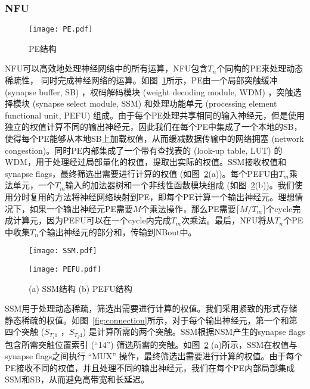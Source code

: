 \subsubsection{NFU}

\begin{figure}[h]
\centering
\texttt{[image: PE.pdf]}
\caption{PE结构}
\label{fig:PE}
\end{figure}

NFU可以高效地处理神经网络中的所有运算，NFU包含$T_n$个同构的PE来处理动态稀疏性， 同时完成神经网络的运算。如图~\ref{fig:PE}所示，PE由一个局部突触缓冲 (synapse buffer, SB) ，权码解码模块 (weight decoding module, WDM) ，突触选择模块 (synapse select module, SSM) 和处理功能单元 (processing element functional unit, PEFU) 组成。由于每个PE处理共享相同的输入神经元，但是使用独立的权值计算不同的输出神经元，因此我们在每个PE中集成了一个本地的SB，使得每个PE能够从本地SB上加载权值，从而缓减数据传输中的网络拥塞 (network congestion)。同时PE内部集成了一个带有查找表的 (look-up table, LUT) 的WDM，用于处理经过局部量化的权值，提取出实际的权值。SSM接收权值和synapse flags，最终筛选出需要进行计算的权值 (如图~\ref{fig:PEFU}(a))。每个PEFU由$T_m$乘法单元，一个$T_m$输入的加法器树和一个非线性函数模块组成 (如图~\ref{fig:PEFU}(b))。我们使用分时复用的方法将神经网络映射到PE，即每个PE计算一个输出神经元。理想情况下，如果一个输出神经元PE需要$M$个乘法操作，那么PE需要$\lceil M/T_{m} \rceil$个cycle完成计算元，因为PEFU可以在一个cycle内完成$T_m$次乘法。最后，NFU将从$T_n$个PE中收集$T_n$个输出神经元的部分和，传输到NBout中。

\begin{figure}[h]
\centering
\begin{minipage}[b]{0.54\columnwidth}
\texttt{[image: SSM.pdf]}
\end{minipage}
\hfill
\begin{minipage}[b]{0.44\columnwidth}
\texttt{[image: PEFU.pdf]}
\end{minipage}
\caption{(a) SSM结构 (b) PEFU结构}
\label{fig:PEFU}
\end{figure}


SSM用于处理动态稀疏，筛选出需要进行计算的权值。我们采用紧致的形式存储静态稀疏的权值。如图~\ref{fig:connection}所示，对于每个输出神经元，第一个和第四个突触 ($S_{T_{i}1}$ ，$S_{T_{i}4}$) 是计算所需的两个突触。SSM根据NSM产生的synapse flags包含所需突触位置索引 (“14”) 筛选所需的突触。如图~\ref{fig:PEFU} (a)所示，SSM在权值与synapse flags之间执行 “MUX” 操作，最终筛选出需要进行计算的权值。由于每个PE接收不同的权值，并且处理不同的输出神经元，我们在每个PE内部局部集成SSM和SB，从而避免高带宽和长延迟。

